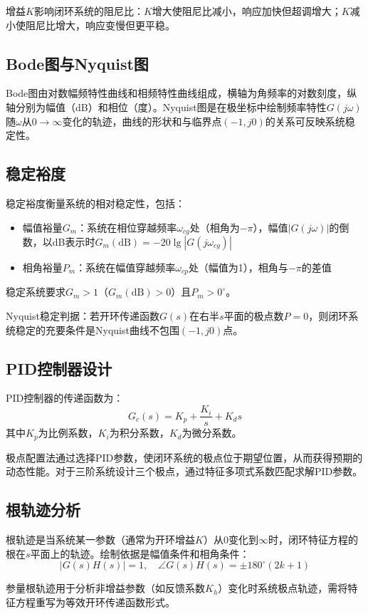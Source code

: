 \documentclass{../common/SCNU_Experimental_Report}
\begin{document}
增益$K$影响闭环系统的阻尼比：$K$增大使阻尼比减小，响应加快但超调增大；$K$减小使阻尼比增大，响应变慢但更平稳。

\subsection{Bode图与Nyquist图}
Bode图由对数幅频特性曲线和相频特性曲线组成，横轴为角频率的对数刻度，纵轴分别为幅值（dB）和相位（度）。Nyquist图是在极坐标中绘制频率特性$G(j\omega)$随$\omega$从$0\to\infty$变化的轨迹，曲线的形状和与临界点$(-1, j0)$的关系可反映系统稳定性。

\subsection{稳定裕度}
稳定裕度衡量系统的相对稳定性，包括：
\begin{itemize}
    \item 幅值裕量$G_m$：系统在相位穿越频率$\omega_{cg}$处（相角为$-\pi$），幅值$|G(j\omega)|$的倒数，以dB表示时$G_m(\text{dB}) = -20\lg|G(j\omega_{cg})|$
    \item 相角裕量$P_m$：系统在幅值穿越频率$\omega_{cp}$处（幅值为1），相角与$-\pi$的差值
\end{itemize}
稳定系统要求$G_m > 1$（$G_m(\text{dB}) > 0$）且$P_m > 0^\circ$。

Nyquist稳定判据：若开环传递函数$G(s)$在右半$s$平面的极点数$P=0$，则闭环系统稳定的充要条件是Nyquist曲线不包围$(-1, j0)$点。

\subsection{PID控制器设计}
PID控制器的传递函数为：
\[
G_c(s) = K_p + \frac{K_i}{s} + K_d s
\]
其中$K_p$为比例系数，$K_i$为积分系数，$K_d$为微分系数。

极点配置法通过选择PID参数，使闭环系统的极点位于期望位置，从而获得预期的动态性能。对于三阶系统设计三个极点，通过特征多项式系数匹配求解PID参数。

\subsection{根轨迹分析}
根轨迹是当系统某一参数（通常为开环增益$K$）从$0$变化到$\infty$时，闭环特征方程的根在$s$平面上的轨迹。绘制依据是幅值条件和相角条件：
\[
|G(s)H(s)| = 1, \quad \angle G(s)H(s) = \pm 180^\circ(2k+1)
\]

参量根轨迹用于分析非增益参数（如反馈系数$K_h$）变化时系统极点轨迹，需将特征方程重写为等效开环传递函数形式。
\end{document}
